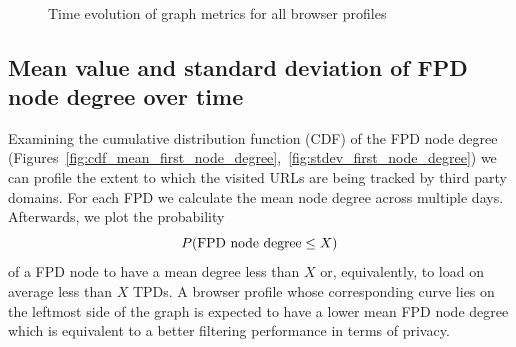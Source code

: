   \begin{figure}
   \centering
{} \hfill
   \\

  \caption{Time evolution of graph metrics for all browser profiles}
  \label{fig:metrics_without_entities}
  \end{figure}

\subsection{Mean value and standard deviation of FPD node degree over time}
Examining the cumulative distribution function (CDF) of the FPD node degree (Figures~\ref{fig:cdf_mean_first_node_degree},~\ref{fig:stdev_first_node_degree}) we can profile the extent to which the visited URLs are being tracked by third party domains. For each FPD we calculate the mean node degree across multiple days. Afterwards, we plot the probability $$P(\textnormal{FPD node degree} \leq X)$$ of a FPD node to have a mean degree less than $X$ or, equivalently, to load on average less than $X$ TPDs. A browser profile whose corresponding curve lies on the leftmost side of the graph is expected to have a lower mean FPD node degree which is equivalent to a better filtering performance in terms of privacy.

